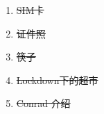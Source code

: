 \documentclass[doku]{subfiles}
\begin{document}
	\begin{enumerate}
		\item \sout{SIM卡}
		\item \sout{证件照}
		\item \sout{筷子}
		\item \sout{Lockdown下的超市}
		\item \sout{Conrad 介绍}
	\end{enumerate}
\end{document}
